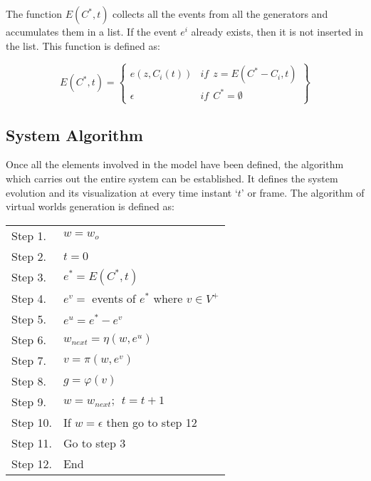 \documentclass[10pt,journal,letterpaper,compsoc]{IEEEtran}
\begin{document}
The function $E(C^*, t)$ collects all the events from all the generators and accumulates them in a
list. If the event $e^i$ already exists, then it is not inserted in the list. This function is
defined as:


\begin{equation}
    E(C^*, t) = \left\{
    \begin{array}{ll}
        e(z, C_i(t))   &  \mathit{if}  \ \ z = E(C^* - C_i, t) \\
        \epsilon   &  \mathit{if} \ \ C^* = \emptyset
    \end{array}
    \right\}
\end{equation}






\subsection{System Algorithm
\label{sec:system_algorithm}}

Once all the elements involved in the model have been defined, the algorithm which carries out the
entire system can be established. It defines the system evolution and its visualization at every
time instant `$t$' or frame. The algorithm of virtual worlds generation is defined as:


\begin{center}
\begin{tabular}{|ll|}
    \hline

    Step 1. & $w = w_o$ \\

    Step 2. & $t = 0$ \\

    Step 3. & $e^* = E(C^*, t)$ \\

    Step 4. & $e^v =$ events of $e^*$ where $v \in V^+$ \\

    Step 5. & $e^u = e^* - e^v$ \\

    Step 6. & $w_{next} = \eta(w, e^u)$ \\

    Step 7. & $v =  \pi(w, e^v)$ \\

    Step 8. & $g = \varphi(v)$ \\

    Step 9. & $w = w_{next}; \ \ t = t + 1$ \\

    Step 10. & If $w = \epsilon$ then go to step 12 \\

    Step 11. & Go to step 3 \\

    Step 12. & End \\

    \hline
\end{tabular}
\end{center}
\end{document}
